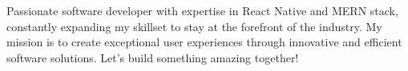 

\begin{cvparagraph}

Passionate software developer with expertise in React Native and MERN stack, constantly expanding my skillset to stay at the forefront of the industry. My mission is to create exceptional user experiences through innovative and efficient software solutions. Let's build something amazing together!
\end{cvparagraph}
